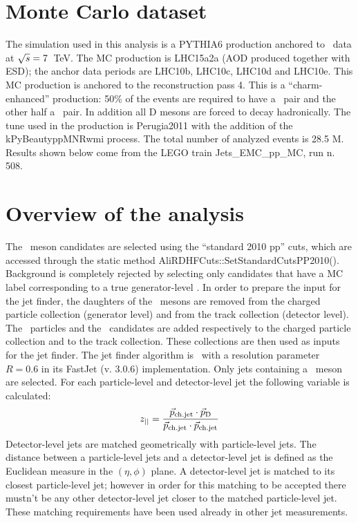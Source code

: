 \section{Monte Carlo dataset}
The simulation used in this analysis is a PYTHIA6 production anchored to \pp\ data at $\sqrt{s}=7$~TeV.
The MC production is LHC15a2a (AOD produced together with ESD); the anchor data periods are LHC10b, LHC10c, LHC10d and LHC10e.
This MC production is anchored to the reconstruction pass 4.
This is a ``charm-enhanced'' production: 50\% of the events are required to have a \ccbar\ pair and the other half a \bbbar\ pair.
In addition all D mesons are forced to decay hadronically. The tune used in the production is Perugia2011 with the addition of the 
{\fontfamily{\ttdefault}kPyBeautyppMNRwmi} process.
The total number of analyzed events is 28.5 M. Results shown below come from the LEGO train Jets\_EMC\_pp\_MC, run n. 508.
\section{Overview of the analysis}
The \Dzero\ meson candidates are selected using the ``standard 2010 pp'' cuts, which are accessed through the static method AliRDHFCuts::SetStandardCutsPP2010(). Background is completely rejected by selecting only candidates that
have a MC label corresponding to a true generator-level \Dzero. In order to prepare the input for the jet finder, the daughters of the \Dzero\ mesons are 
removed from the charged particle collection (generator level) and from the track collection (detector level). The \Dzero\ particles and the \Dzero\ candidates are
added respectively to the charged particle collection and to the track collection. These collections are then used as inputs for the jet finder.
The jet finder algorithm is \antikt\ with a resolution parameter $R=0.6$ in its FastJet (v. 3.0.6) implementation.
Only jets containing a \Dzero\ meson are selected. For each particle-level and detector-level jet the following variable is calculated:
\begin{equation}
z_{||}=\frac{\vec{p}_{\mathrm{ch.jet}}\cdot\vec{p}_{\mathrm{D}}}{\vec{p}_{\mathrm{ch.jet}}\cdot\vec{p}_{\mathrm{ch.jet}}}
\end{equation}
Detector-level jets are matched geometrically with particle-level jets. The distance between a particle-level jets and a detector-level jet is defined 
as the Euclidean measure in the $\left(\eta,\phi\right)$ plane. A detector-level jet is matched to its closest particle-level jet; however in order for this matching to be accepted
there mustn't be any other detector-level jet closer to the matched particle-level jet. These matching requirements have been used 
already in other jet measurements.

